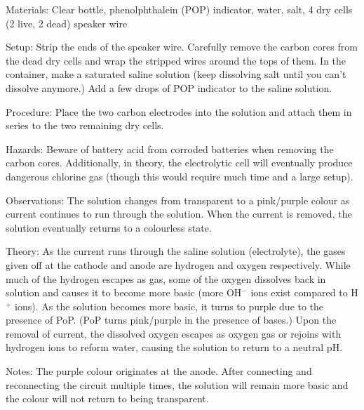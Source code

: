 \begin{multicols}{2}
\begin{description*}
\item[Materials:]{Clear bottle, phenolphthalein (POP) indicator, water, salt, 4 dry cells (2 live, 2 dead) speaker wire}
\item[Setup:]{Strip the ends of the speaker wire. Carefully remove the carbon cores from the dead dry cells and wrap the stripped wires around the tops of them. In the container, make a saturated saline solution (keep dissolving salt until you can't dissolve anymore.) Add a few drops of POP indicator to the saline solution.}
\item[Procedure:]{Place the two carbon electrodes into the solution and attach them in series to the two remaining dry cells.}
\item[Hazards:]{Beware of battery acid from corroded batteries when removing the carbon cores. Additionally, in theory, the electrolytic cell will eventually produce dangerous chlorine gas (though this would require much time and a large setup).}
\item[Observations:]{The solution changes from transparent to a pink/purple colour as current continues to run through the solution. When the current is removed, the solution eventually returns to a colourless state.}
\item[Theory:]{As the current runs through the saline solution (electrolyte), the gases given off at the cathode and anode are hydrogen and oxygen respectively. While much of the hydrogen escapes as gas, some of the oxygen dissolves back in solution and causes it to become more basic (more OH$^-$ ions exist compared to H$^+$ ions). As the solution becomes more basic, it turns to purple due to the presence of PoP. (PoP turns pink/purple in the presence of bases.) Upon the removal of current, the dissolved oxygen escapes as oxygen gas or rejoins with hydrogen ions to reform water, causing the solution to return to a neutral pH.}
\item[Notes:]{The purple colour originates at the anode. After connecting and reconnecting the circuit multiple times, the solution will remain more basic and the colour will not return to being transparent.}
\end{description*}

\vfill
\columnbreak



\end{multicols}

